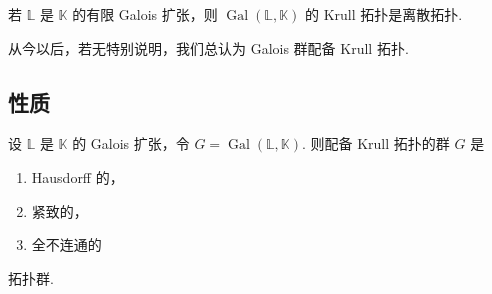 \begin{remark}\label{c2-rem-2-4}
若 $\mathbb{L}$ 是 $\mathbb{K}$ 的有限 Galois 扩张，则 $\operatorname{Gal}(\mathbb{L},\mathbb{K})$ 的 Krull 拓扑是离散拓扑.
\end{remark}

\begin{remark}\label{c2-rem-2-5}
从今以后，若无特别说明，我们总认为 Galois 群配备 Krull 拓扑.
\end{remark}

\subsection{性质}

\begin{theorem}\label{c2-thm-2-6}
设 $\mathbb{L}$ 是 $\mathbb{K}$ 的 Galois 扩张，令 $G=\operatorname{Gal}(\mathbb{L},\mathbb{K})$. 则配备 Krull 拓扑的群 $G$ 是
\begin{enumerate}
    \item Hausdorff 的，
    \item 紧致的，
    \item 全不连通的
\end{enumerate}
拓扑群.
\end{theorem}

